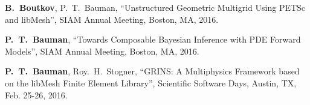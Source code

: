 \textbf{B.~Boutkov}, P.~T.~Bauman, ``Unstructured Geometric Multigrid Using
PETSc and libMesh'', SIAM Annual Meeting, Boston, MA, 2016.

\blankline

\textbf{P.~T.~Bauman}, ``Towards Composable Bayesian Inference with
PDE Forward Models'', SIAM Annual Meeting, Boston, MA, 2016.

\newpage

\textbf{P.~T.~Bauman}, Roy.~H.~Stogner, ``GRINS: A Multiphysics Framework based on the libMesh
Finite Element Library'', Scientific Software Days, Austin, TX,
Feb. 25-26, 2016.
